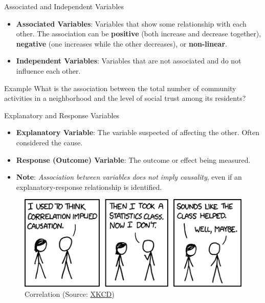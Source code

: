 \documentclass[handout]{beamer} %
\begin{document}
\begin{frame}{Associated and Independent Variables}
    \begin{itemize}
        \item \textbf{Associated Variables}: Variables that show some relationship with each other. The association can be \textbf{positive} (both increase and decrease together), \textbf{negative} (one increases while the other decreases), or \textbf{non-linear}.
        \item \textbf{Independent Variables}: Variables that are not associated and do not influence each other.
    \end{itemize}
\end{frame}

\begin{frame}{Example}
What is the association between the total number of community activities in a neighborhood and the level of social trust among its residents?
\vspace{7cm}
\end{frame}

\begin{frame}{Explanatory and Response Variables}
    \begin{itemize}
        \item \textbf{Explanatory Variable}: The variable suspected of affecting the other. Often considered the cause.    \pause  %
        \item \textbf{Response (Outcome) Variable}: The outcome or effect being measured.     \pause  %
        \item \textbf{Note}: \emph{Association between variables does not imply causality}, even if an explanatory-response relationship is identified.     \pause  %
    \end{itemize}

    \begin{figure}[h]
        \centering
        \includegraphics[width=0.5\linewidth]{correlation.png}
        \caption{Correlation (Source: \href{https://xkcd.com/552/}{XKCD})}
    \end{figure}
\end{frame}
\end{document}
